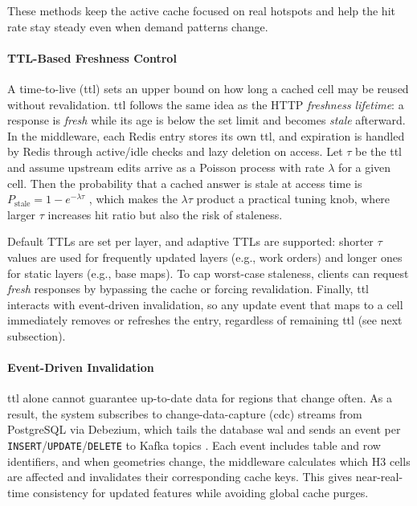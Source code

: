 These methods keep the active cache focused on real hotspots and help the hit rate stay steady even when demand patterns change.

\paragraph{TTL-Based Freshness Control}
A time-to-live (\ac{ttl}) sets an upper bound on how long a cached cell may be reused without revalidation. \ac{ttl} follows the same idea as the HTTP \emph{freshness lifetime}: a response is \emph{fresh} while its age is below the set limit and becomes \emph{stale} afterward. In the middleware, each Redis entry stores its own \ac{ttl}, and expiration is handled by Redis through active/idle checks and lazy deletion on access. Let $\tau$ be the \ac{ttl} and assume upstream edits arrive as a Poisson process with rate $\lambda$ for a given cell. Then the probability that a cached answer is stale at access time is $P_{\text{stale}} = 1-e^{-\lambda \tau}$ \cite{PishroNik_PoissonProcess_Basics}, which makes the $\lambda\tau$ product a practical tuning knob, where larger $\tau$ increases hit ratio but also the risk of staleness.

Default TTLs are set per layer, and adaptive TTLs are supported: shorter $\tau$ values are used for frequently updated layers (e.g., work orders) and longer ones for static layers (e.g., base maps). To cap worst-case staleness, clients can request \emph{fresh} responses by bypassing the cache or forcing revalidation. Finally, \ac{ttl} interacts with event-driven invalidation, so any update event that maps to a cell immediately removes or refreshes the entry, regardless of remaining \ac{ttl} (see next subsection).

\paragraph{Event-Driven Invalidation}
\ac{ttl} alone cannot guarantee up-to-date data for regions that change often. As a result, the system subscribes to change-data-capture (\ac{cdc}) streams from PostgreSQL via Debezium, which tails the database \ac{wal} and sends an event per \texttt{INSERT}/\texttt{UPDATE}/\texttt{DELETE} to Kafka topics \cite{Debezium_Postgres}. Each event includes table and row identifiers, and when geometries change, the middleware calculates which H3 cells are affected and invalidates their corresponding cache keys. This gives near-real-time consistency for updated features while avoiding global cache purges.

